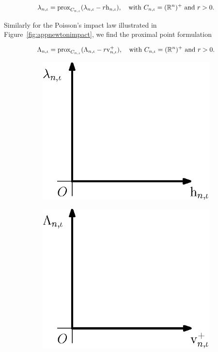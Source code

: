\documentclass[../DC2017114Bouma.tex]{subfiles}
\begin{document}
\begin{align}
\lambda_{n,\iota} = \operatorname{\text{prox}}_{C_{n,\iota}}(\lambda_{n,\iota} - r\mathrm{h}_{n,\iota}),\quad \text{with }C_{n,\iota} = (\mathbb{R}^n)^+\text{ and } r>0.
\end{align}

Similarly for the Poisson's impact law illustrated in Figure~\ref{fig:appnewtonimpact}, we find the proximal point formulation

\begin{align}
\Lambda_{n,\iota} = \operatorname{\text{prox}}_{C_{n,\iota}}(\Lambda_{n,\iota} - r\mathrm{v}^+_{n,\iota}),\quad \text{with }C_{n,\iota} = (\mathbb{R}^n)^+\text{ and } r>0.
\end{align}

\begin{figure}[bt!]
\centering
\begin{subfigure}{0.3\textwidth}
\centering
\includegraphics[width=\linewidth]{signorinicontact.eps}
\caption{}\label{fig:appsignorinicontact}
\end{subfigure}
\qquad
\begin{subfigure}{0.3\textwidth}
\centering
\includegraphics[width=\linewidth]{newtonimpact.eps}

\end{subfigure}
\end{figure}
\end{document}

